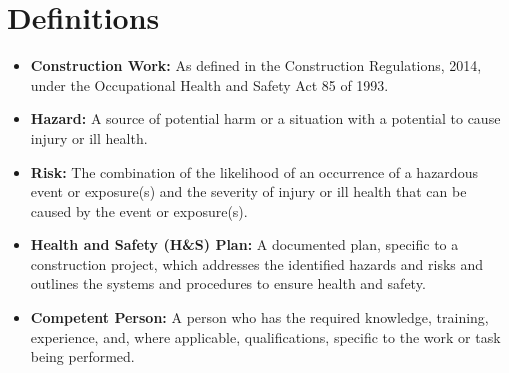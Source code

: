 \documentclass[12pt]{article}
\begin{document}
\section{Definitions}
\begin{itemize}
    \item \textbf{Construction Work:} As defined in the Construction Regulations, 2014, under the Occupational Health and Safety Act 85 of 1993.
    \item \textbf{Hazard:} A source of potential harm or a situation with a potential to cause injury or ill health.
    \item \textbf{Risk:} The combination of the likelihood of an occurrence of a hazardous event or exposure(s) and the severity of injury or ill health that can be caused by the event or exposure(s).
    \item \textbf{Health and Safety (H\&S) Plan:} A documented plan, specific to a construction project, which addresses the identified hazards and risks and outlines the systems and procedures to ensure health and safety.
    \item \textbf{Competent Person:} A person who has the required knowledge, training, experience, and, where applicable, qualifications, specific to the work or task being performed.
\end{itemize}
\end{document}
